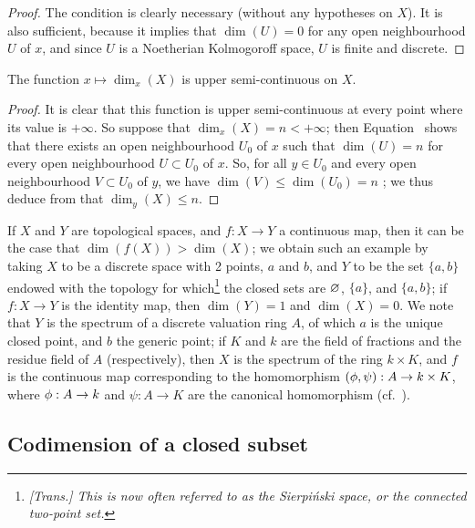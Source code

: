 \begin{proof}
\label{proof-0.14.1.10}
The condition is clearly necessary (without any hypotheses on $X$).
It is also sufficient,
because it implies that $\dim(U)=0$ for any open neighbourhood $U$ of $x$, and since $U$ is a Noetherian Kolmogoroff space, $U$ is finite and discrete.
\end{proof}

\begin{proposition}[14.1.11]
\label{0.14.1.11}
The function $x\mapsto\dim_x(X)$ is upper semi-continuous on $X$.
\end{proposition}

\begin{proof}
\label{proof-0.14.1.11}
It is clear that this function is upper semi-continuous at every point where its value is $+\infty$.
So suppose that $\dim_x(X)=n<+\infty$;
then Equation~ shows that there exists an open neighbourhood $U_0$ of $x$ such that $\dim(U)=n$ for every open neighbourhood $U\subset U_0$ of $x$.
So, for all $y\in U_0$ and every open neighbourhood $V\subset U_0$ of $y$, we have $\dim(V)\leq\dim(U_0)=n$ ;
we thus deduce from  that $\dim_y(X)\leq n$.
\end{proof}

\begin{remark}[14.1.12]
\label{0.14.1.12}
If $X$ and $Y$ are topological spaces, and $f:X\to Y$ a continuous map, then it can be the case that $\dim(f(X))>\dim(X)$;
we obtain such an example by taking $X$ to be a discrete space with 2 points, $a$ and $b$, and $Y$ to be the set $\{a,b\}$ endowed with the topology for which\footnote{\emph{[Trans.] This is now often referred to as the \emph{Sierpi\'nski space}, or the \emph{connected two-point set}.}} the closed sets are $\varnothing$, $\{a\}$, and $\{a,b\}$;
if $f:X\to Y$ is the identity map, then $\dim(Y)=1$ and $\dim(X)=0$.
We note that $Y$ is the spectrum of a discrete valuation ring $A$, of which $a$ is the unique closed point, and $b$ the generic point;
if $K$ and $k$ are the field of fractions and the residue field of $A$ (respectively), then $X$ is the spectrum of the ring $k\times K$, and $f$ is the continuous map corresponding to the homomorphism $(\vphi,\psi):A\to k\times K$, where $\vphi:A\to k$ and $\psi:A\to K$ are the canonical homomorphism (cf.~).
\end{remark}

\subsection{Codimension of a closed subset}
\label{subsection:0.14.2}


